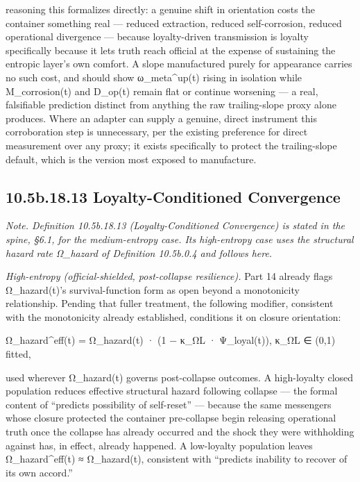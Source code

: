 \documentclass[
]{article}
\begin{document}
reasoning this formalizes directly: a genuine shift in orientation costs
the container something real --- reduced extraction, reduced
self-corrosion, reduced operational divergence --- because
loyalty-driven transmission is loyalty specifically because it lets
truth reach official at the expense of sustaining the entropic layer's
own comfort. A slope manufactured purely for appearance carries no such
cost, and should show ω\_meta\^{}up(t) rising in isolation while
M\_corrosion(t) and D\_op(t) remain flat or continue worsening --- a
real, falsifiable prediction distinct from anything the raw
trailing-slope proxy alone produces. Where an adapter can supply a
genuine, direct instrument this corroboration step is unnecessary, per
the existing preference for direct measurement over any proxy; it exists
specifically to protect the trailing-slope default, which is the version
most exposed to manufacture.

\hypertarget{b.18.13-loyalty-conditioned-convergence}{%
\subsection{10.5b.18.13 Loyalty-Conditioned
Convergence}\label{b.18.13-loyalty-conditioned-convergence}}

\emph{Note. Definition 10.5b.18.13 (Loyalty-Conditioned Convergence) is
stated in the spine, §6.1, for the medium-entropy case. Its high-entropy
case uses the structural hazard rate Ω\_hazard of Definition 10.5b.0.4
and follows here.}

\emph{High-entropy (official-shielded, post-collapse resilience).} Part
14 already flags Ω\_hazard(t)'s survival-function form as open beyond a
monotonicity relationship. Pending that fuller treatment, the following
modifier, consistent with the monotonicity already established,
conditions it on closure orientation:

Ω\_hazard\^{}eff(t) = Ω\_hazard(t) · (1 − κ\_ΩL · Ψ\_loyal(t)), κ\_ΩL ∈
(0,1) fitted,

used wherever Ω\_hazard(t) governs post-collapse outcomes. A
high-loyalty closed population reduces effective structural hazard
following collapse --- the formal content of ``predicts possibility of
self-reset'' --- because the same messengers whose closure protected the
container pre-collapse begin releasing operational truth once the
collapse has already occurred and the shock they were withholding
against has, in effect, already happened. A low-loyalty population
leaves Ω\_hazard\^{}eff(t) ≈ Ω\_hazard(t), consistent with ``predicts
inability to recover of its own accord.''
\end{document}
